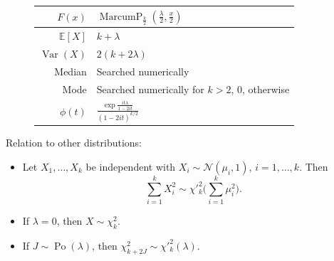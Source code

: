 \documentclass[a4paper,11pt]{article}
\theoremstyle{plain}
\theoremstyle{definition}
\newcommand{\ME}{\mathbb{E}}
\newcommand{\Var}{\operatorname{Var}}
\begin{document}
\begin{figure}[!htb]
\begin{minipage}{0.4\textwidth}
\begin{tabular}{| r | l |}
			\hline
			$F(x)$ & $\operatorname{MarcumP}_{\frac{k}{2}}(\frac{\lambda}{2}, \frac{x}{2}) $\\
			\hline
			$\ME[X]$ & $ k + \lambda$ \\
			\hline
			$\Var(X)$ & $2(k+2\lambda)$ \\
			\hline
			Median & Searched numerically\\
			\hline
			Mode & \pbox{\linewidth}{Searched numerically for $k > 2$, \\ $0$, otherwise}  \\
			\hline
			$\phi(t)$ & $ \frac{\exp{\frac{it\lambda}{1-2it}}}{(1-2it)^{k/2}}$ \\
			\hline
		\end{tabular}
	\end{minipage}
    \end{figure}
    Relation to other distributions: 
    \begin{itemize}
    	\item Let $X_1, \dots, X_k$ be independent with $X_i \sim \mathcal{N}(\mu_i, 1)$, $i = 1, \dots, k$. Then
    	\[
    	\sum_{i=1}^{k}X_i^2 \sim \chi'^2_k\big(\sum_{i=1}^{k}\mu_i^2\big).
    	\]
    	\item If $\lambda = 0$, then $X \sim \chi^2_k$.
    	\item If $J \sim \operatorname{Po}(\lambda)$, then $\chi^2_{k+2J} \sim \chi'^2_k(\lambda)$.
    \end{itemize}
    

\pagebreak
\end{document}
